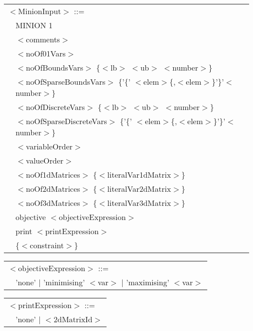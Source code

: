 \documentclass{article}
\begin{document}
\begin{small}
\noindent
\setlength{\tabcolsep}{0mm}
\begin{tabular}{ll}
\multicolumn{2}{l}{$<$MinionInput$>$ ::=} \\
\hspace*{2mm} &MINION 1\\
              &$<$comments$>$\\
              &$<$noOf01Vars$>$\\
              &$<$noOfBoundsVars$>$ \{$<$lb$>$ $<$ub$>$ $<$number$>$\}\\
              &$<$noOfSparseBoundsVars$>$ \{'\{' $<$elem$>$\{,$<$elem$>$\}'\}'$<$number$>$\}\\
              &$<$noOfDiscreteVars$>$ \{$<$lb$>$ $<$ub$>$ $<$number$>$\}\\
              &$<$noOfSparseDiscreteVars$>$ \{'\{' $<$elem$>$\{,$<$elem$>$\}'\}'$<$number$>$\}\\
              &$<$variableOrder$>$\\
              &$<$valueOrder$>$\\
              &$<$noOf1dMatrices$>$ \{$<$literalVar1dMatrix$>$\}\\
              &$<$noOf2dMatrices$>$ \{$<$literalVar2dMatrix$>$\}\\
              &$<$noOf3dMatrices$>$ \{$<$literalVar3dMatrix$>$\}\\
              &objective $<$objectiveExpression$>$\\
              &print $<$printExpression$>$\\
              &\{$<$constraint$>$\}
\end{tabular}
\vspace*{1mm}

\noindent
\setlength{\tabcolsep}{0mm}
\begin{tabular}{ll}
\multicolumn{2}{l}{$<$objectiveExpression$>$ ::=}\\
\hspace*{2mm} & 'none' $|$ 'minimising' $<$var$>$ $|$ 'maximising' $<$var$>$\\
\end{tabular}
\vspace*{1mm}

\noindent
\setlength{\tabcolsep}{0mm}
\begin{tabular}{ll}
\multicolumn{2}{l}{$<$printExpression$>$ ::=}\\
\hspace*{2mm} & 'none' $|$ $<$2dMatrixId$>$\\
\end{tabular}
\vspace*{1mm}


\end{small}
\end{document}
